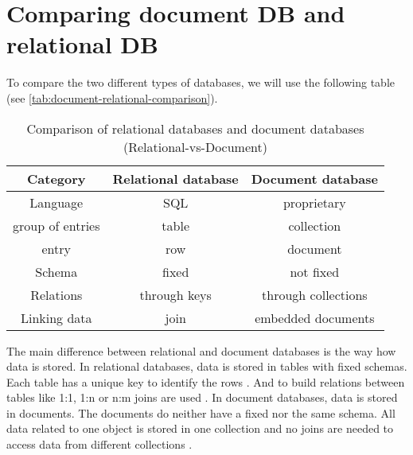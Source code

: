 
\section{Comparing document DB and relational DB}

To compare the two different types of databases, we will use the following table (see \autoref{tab:document-relational-comparison}).

\begin{table}[H]
    \centering
    \begin{adjustbox}{width=1\textwidth}
        \begin{tabular}{c|c|c}
            \textbf{Category} & \textbf{Relational database}    & \textbf{Document database} \\ \hline \hline
            Language          & SQL                             & proprietary                \\ 
            group of entries  & table                           & collection                 \\ 
            entry             & row                             & document                   \\ 
            Schema            & fixed                           & not fixed                  \\ 
            Relations         & through keys                    & through collections        \\ 
            Linking data      & join                            & embedded documents         \\ 
        \end{tabular}
    \end{adjustbox}
    \caption{Comparison of relational databases and document databases (\textcite[p. 91]{chauhan2019review}{Relational-vs-Document})}
    \label{tab:document-relational-comparison}
\end{table}
\color{black}

The main difference between relational and document databases is the way how data is stored. 
In relational databases, data is stored in tables with fixed schemas. Each table has a unique key to identify the rows \parencite{chauhan2019review, Relational-vs-Document}. 
And to build relations between tables like 1:1, 1:n or n:m joins are used \parencite[pp. 25-31]{Studer2019}.
In document databases, data is stored in documents. The documents do neither have a fixed nor the same schema. 
All data related to one object is stored in one collection and no joins are needed to access data from different collections \parencite[pp. 18-20]{Meier2016}.


